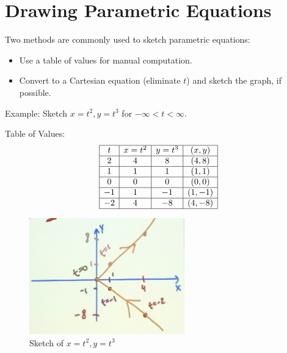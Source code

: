 \documentclass[12pt]{article}
\begin{document}
\pagebreak

\section*{Drawing Parametric Equations}
Two methods are commonly used to sketch parametric equations:
\begin{itemize}
    \item Use a table of values for manual computation.
    \item Convert to a Cartesian equation (eliminate \( t \)) and sketch the graph, if possible.
\end{itemize}

Example:
Sketch \( x = t^2, y = t^3 \) for \( -\infty < t < \infty \).

Table of Values:
\[
\begin{array}{|c|c|c|c|}
\hline
t & x = t^2 & y = t^3 & (x, y) \\ \hline
2 & 4 & 8 & (4, 8) \\ \hline
1 & 1 & 1 & (1, 1) \\ \hline
0 & 0 & 0 & (0, 0) \\ \hline
-1 & 1 & -1 & (1, -1) \\ \hline
-2 & 4 & -8 & (4, -8) \\ \hline
\end{array}
\]

\begin{figure}[h!]
\centering
\includegraphics[width=0.6\textwidth]{sketching_example1.jpg}
\caption{Sketch of \( x = t^2, y = t^3 \)}
\label{fig:sketch_example1}
\end{figure}
\end{document}

